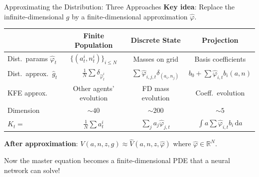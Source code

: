 \documentclass[aspectratio=169,11pt]{beamer}
\newcommand{\emphc}[1]{\textcolor{harvardcrimson}{#1}}
\newcommand{\R}{\mathbb{R}}
\newcommand{\ud}{\,\mathrm{d}}
\begin{document}
\begin{frame}{Approximating the Distribution: Three Approaches}
\small
\textbf{Key idea}: Replace the infinite-dimensional $g$ by a \emphc{finite-dimensional} approximation $\hat{\varphi}$.

\vspace{0.2em}
\begin{center}
\small
\renewcommand{\arraystretch}{1.25}
\begin{tabular}{lccc}
\toprule
& \textbf{Finite Population} & \textbf{Discrete State} & \textbf{Projection} \\
\midrule
Dist.\ params $\hat{\varphi}_t$ & $\{(a_t^i, n_t^i)\}_{i\leq N}$ & Masses on grid & Basis coefficients \\[2pt]
Dist.\ approx.\ $\hat{g}_t$ & $\frac{1}{N}\sum \delta_{\hat{\varphi}_t^i}$ & $\sum \hat{\varphi}_{i,j,t}\delta_{(a_i,n_j)}$ & $b_0 + \sum \hat{\varphi}_{i,t}b_i(a,n)$ \\[2pt]
KFE approx. & Other agents' evolution & FD mass evolution & Coeff.\ evolution \\[2pt]
Dimension & $\sim 40$ & $\sim 200$ & $\sim 5$ \\[2pt]
$K_t =$ & $\frac{1}{N}\sum a_t^i$ & $\sum_j a_j \hat{\varphi}_{j,t}$ & $\int a \sum \hat{\varphi}_{i,t}b_i \ud a$ \\
\bottomrule
\end{tabular}
\end{center}

\vspace{0.2em}
\textbf{After approximation}: $V(a, n, z, g) \approx \hat{V}(a, n, z, \hat{\varphi})$ where $\hat{\varphi} \in \R^N$.

Now the master equation becomes a \emphc{finite-dimensional PDE} that a neural network can solve!
\end{frame}
\end{document}
